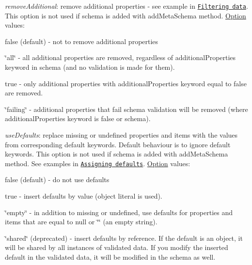 \begin{DoxyItemize}
\item {\itshape remove\+Additional}\+: remove additional properties -\/ see example in \href{#filtering-data}{\tt Filtering data}. This option is not used if schema is added with {\ttfamily add\+Meta\+Schema} method. \mbox{\hyperlink{structOption}{Option}} values\+:
\begin{DoxyItemize}
\item {\ttfamily false} (default) -\/ not to remove additional properties
\item {\ttfamily \char`\"{}all\char`\"{}} -\/ all additional properties are removed, regardless of {\ttfamily additional\+Properties} keyword in schema (and no validation is made for them).
\item {\ttfamily true} -\/ only additional properties with {\ttfamily additional\+Properties} keyword equal to {\ttfamily false} are removed.
\item {\ttfamily \char`\"{}failing\char`\"{}} -\/ additional properties that fail schema validation will be removed (where {\ttfamily additional\+Properties} keyword is {\ttfamily false} or schema).
\end{DoxyItemize}
\item {\itshape use\+Defaults}\+: replace missing or undefined properties and items with the values from corresponding {\ttfamily default} keywords. Default behaviour is to ignore {\ttfamily default} keywords. This option is not used if schema is added with {\ttfamily add\+Meta\+Schema} method. See examples in \href{#assigning-defaults}{\tt Assigning defaults}. \mbox{\hyperlink{structOption}{Option}} values\+:
\begin{DoxyItemize}
\item {\ttfamily false} (default) -\/ do not use defaults
\item {\ttfamily true} -\/ insert defaults by value (object literal is used).
\item {\ttfamily \char`\"{}empty\char`\"{}} -\/ in addition to missing or undefined, use defaults for properties and items that are equal to {\ttfamily null} or {\ttfamily \char`\"{}\char`\"{}} (an empty string).
\item {\ttfamily \char`\"{}shared\char`\"{}} (deprecated) -\/ insert defaults by reference. If the default is an object, it will be shared by all instances of validated data. If you modify the inserted default in the validated data, it will be modified in the schema as well.
\end{DoxyItemize}

\end{DoxyItemize}
